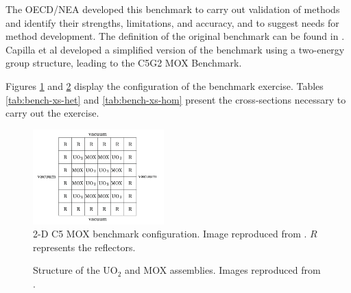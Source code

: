 \documentclass[letterpaper]{article}
\begin{document}
The \gls{OECD}/\gls{NEA} developed this benchmark to carry out validation of methods and identify their strengths, limitations, and accuracy, and to suggest needs for method development.
The definition of the original benchmark can be found in \cite{oecdnea_benchmark_2003}.
Capilla et al \cite{capilla_applications_2009} developed a simplified version of the benchmark using a two-energy group structure, leading to the C5G2 MOX Benchmark.

Figures \ref{res:2d-bench-config1} and \ref{res:2d-bench-config2} display the configuration of the benchmark exercise.
Tables \ref{tab:bench-xs-het} and \ref{tab:bench-xs-hom} present the cross-sections necessary to carry out the exercise.

\begin{figure}[h!]
    \centering
    \includegraphics[width=0.45\textwidth]{../C5G2-benchmark/bench-config}
    \caption{2-D C5 MOX benchmark configuration. Image reproduced from \cite{capilla_applications_2009}. $R$ represents the reflectors.}
    \label{res:2d-bench-config1}
\end{figure}

\begin{figure}[htbp!]
    \centering
    \caption{Structure of the UO$_2$ and MOX assemblies. Images reproduced from \cite{capilla_applications_2009}.}
    \label{res:2d-bench-config2}
\end{figure}
\end{document}
